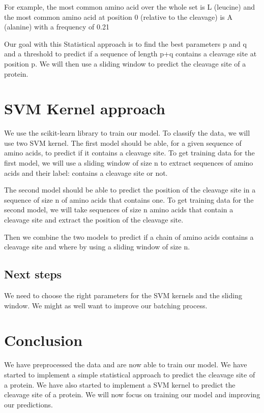 \documentclass[a4paper,12pt]{report}
\begin{document}
For example, the most common amino acid over the whole set is L (leucine) and the most common amino acid at position 0 (relative to the cleavage) is A (alanine) with a frequency of 0.21

Our goal with this Statistical approach is to find the best parameters p and q and a threshold to predict if a sequence of length p+q contains a cleavage site at position p.
We will then use a sliding window to predict the cleavage site of a protein.

\section*{SVM Kernel approach}
We use the scikit-learn library to train our model.
To classify the data, we will use  two SVM kernel. 
The first model should be able, for a given sequence of amino acids, to predict if it contains a cleavage site.
To get training data for the first model, we will use a sliding window of size n to extract 
sequences of amino acids and their label: contains a cleavage site or not.



The second model should be able to predict the position of the cleavage site in a sequence of size n of amino acids that contains one.
To get training data for the second model, we will take sequences of 
size n amino acids that contain a cleavage site and extract the position of the cleavage site.

Then we combine the two models to predict if a chain of amino acids contains a cleavage site and where 
by using a sliding window of size n. 

\subsection*{Next steps}
We need to choose the right parameters for the SVM kernels and the sliding window.
We might as well want to improve our batching process.

\section*{Conclusion}
We have preprocessed the data and are now able to train our model.
We have started to implement a simple statistical approach to predict the cleavage site of a protein.
We have also started to implement a SVM kernel to predict the cleavage site of a protein.
We will now focus on training our model and improving our predictions.
\end{document}
